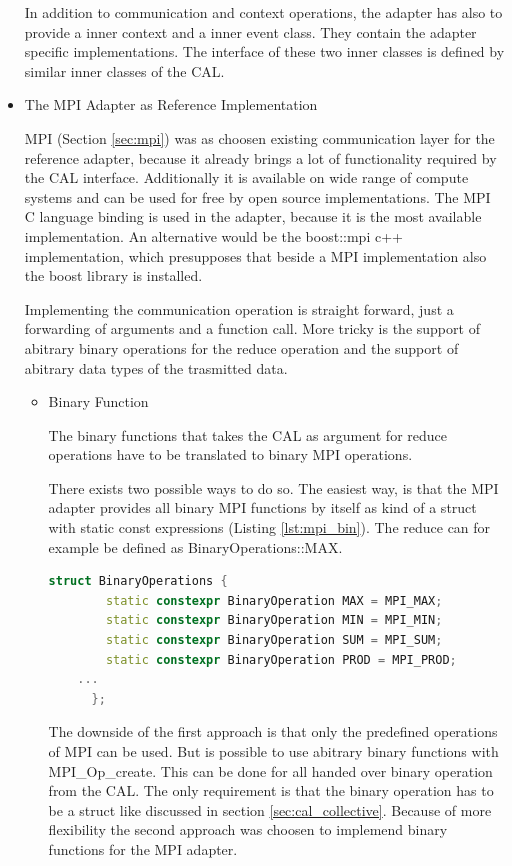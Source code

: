 \begin{itemize}
  In addition to communication and context operations, the adapter has
  also to provide a inner context and a inner event class.  They
  contain the adapter specific implementations. The interface of these
  two inner classes is defined by similar inner classes of the CAL.

\item The MPI Adapter as Reference Implementation

  MPI (Section \ref{sec:mpi}) was as choosen existing communication
  layer for the reference adapter, because it already brings a lot of
  functionality required by the CAL interface. Additionally it is
  available on wide range of compute systems and can be used for free
  by open source implementations. The MPI C language binding is used
  in the adapter, because it is the most available implementation. An
  alternative would be the boost::mpi c++ implementation, which
  presupposes that beside a MPI implementation also the boost library
  is installed.

  Implementing the communication operation is straight forward, just a
  forwarding of arguments and a function call. More tricky is the
  support of abitrary binary operations for the reduce operation and
  the support of abitrary data types of the trasmitted data.

  \begin{itemize}
  \item Binary Function

    The binary functions that takes the CAL as argument for reduce 
    operations have to be translated to binary MPI operations.

    There exists two possible ways to do so. The easiest way, is that
    the MPI adapter provides all binary MPI functions by itself as
    kind of a struct with static const expressions (Listing
    \ref{lst:mpi_bin}). The reduce can for example be defined as
    BinaryOperations::MAX.

    \begin{lstlisting}[language=C++]
      struct BinaryOperations { 	
        static constexpr BinaryOperation MAX = MPI_MAX; 	
        static constexpr BinaryOperation MIN = MPI_MIN; 	
        static constexpr BinaryOperation SUM = MPI_SUM; 	
        static constexpr BinaryOperation PROD = MPI_PROD;
	...
      };
    \end{lstlisting}
    \label{lst:mpi_bin}

    The downside of the first approach is that only the predefined
    operations of MPI can be used. But is possible to use abitrary
    binary functions with MPI\_Op\_create. This can be done for all
    handed over binary operation from the CAL. The only requirement is
    that the binary operation has to be a struct like discussed in
    section \ref{sec:cal_collective}.  Because of more flexibility the
    second approach was choosen to implemend binary functions for the
    MPI adapter.


\end{itemize}
\end{itemize}
